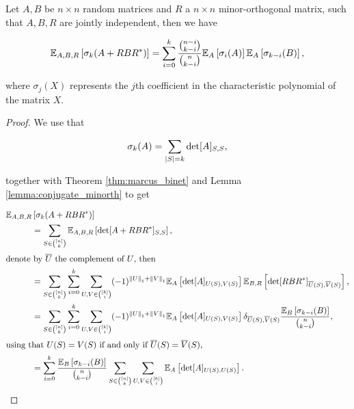 \begin{theorem} \label{thm:implies_symmad}
    Let $A, B$ be $n\times n$ random matrices and $R$ a $n\times n$ minor-orthogonal matrix, such that $A, B, R$ are jointly independent, then we have

    \begin{equation*}
        \mathbb E_{A,B,R}\left[ \sigma_k(A + RBR^*) \right] =  \sum_{i=0}^k \frac{\binom{n-i}{k-i}}{\binom{n}{k-i}}\mathbb E_{A} \left[\sigma_i(A)\right] \mathbb E_{A}\left[\sigma_{k-i}(B)\right],
    \end{equation*}

    \noindent where $\sigma_j(X)$ represents the $j$th coefficient in the characteristic polynomial of the matrix $X$.
\end{theorem}

\begin{proof}
    We use that

    \begin{equation*}
        \sigma_k(A) = \sum_{\lvert S \rvert=k} \det[A]_{S,S},
    \end{equation*}

    \noindent together with Theorem \ref{thm:marcus_binet} and Lemma \ref{lemma:conjugate_minorth} to get 

    \begin{align*}
        \mathbb E_{A,B,R}&\left[ \sigma_k(A + RBR^*) \right]\\ &= \sum_{S \in \binom{[n]}{k}} \mathbb E_{A,B,R} \left[ \det[A + RBR^*]_{S,S} \right],\\ 
        \intertext{denote by $\overline U$ the complement of $U$, then}
        &= \sum_{S\in\binom{[n]}{k}} \sum_{i=0}^k \sum_{U,V\in \binom{[k]}{i}} (-1)^{\left\lVert U\right\rVert_1 + \left\lVert V\right\rVert_1} \mathbb E_A\left[ \det [A]_{U(S),V(S)} \right] \mathbb E_{B,R}\left[ \det[RBR^*]_{\overline{U}(S),\overline{V}(S)} \right],\\ 
        &= \sum_{S\in\binom{[n]}{k}} \sum_{i=0}^k \sum_{U,V\in \binom{[k]}{i}} (-1)^{\left\lVert U\right\rVert_1 + \left\lVert V\right\rVert_1} \mathbb E_A\left[ \det[A]_{U(S),V(S)} \right] \delta_{\overline{U}(S),\overline{V}(S)} \frac{\mathbb E_{B}\left[ \sigma_{k-i}(B)\right]}{\binom{n}{k-i}},\\ 
        \intertext{using that $U(S)=V(S)$ if and only if $\overline{U}(S) = \overline{V}(S)$,}
        &= \sum_{i=0}^k \frac{\mathbb E_{B}\left[ \sigma_{k-i}(B)\right]}{\binom{n}{k-i}} \sum_{S\in\binom{[n]}{k}} \sum_{U,V\in \binom{[k]}{i}}  \mathbb E_A\left[\det[A]_{U(S),U(S)} \right].
    \end{align*}


\end{proof}
